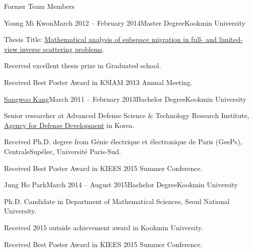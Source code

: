 \documentclass{resume} %
\begin{document}
\begin{rSection}{Former Team Members}
\begin{rSubsection}{Young Mi Kwon}{March 2012 -- February 2014}{Master Degree}{Kookmin University}
\item Thesis Title: \href{http://www.riss.kr/link?id=T13428254}{Mathematical analysis of subspace migration in full- and limited-view inverse scattering problems}.
\item Received excellent thesis prize in Graduated school.
\item Received Best Poster Award in KSIAM 2013 Annual Meeting.
\end{rSubsection}

\begin{rSubsection}{\href{https://sites.google.com/view/sangwookang/home}{Sangwoo Kang}}{March 2011 -- February 2013}{Bachelor Degree}{Kookmin University}
\item Senior researcher at Advanced Defense Science \& Technology Research Institute, \href{https://www.add.re.kr/eps}{Agency for Defense Development} in Korea.
\item Received Ph.D. degree from G\'enie \'electrique et \'electronique de Paris (GeePs), CentraleSup{\'e}lec, Universit\'e Paris-Sud.
\item Received Best Poster Award in KIEES 2015 Summer Conference.
\end{rSubsection}

\begin{rSubsection}{Jung Ho Park}{March 2014 -- August 2015}{Bachelor Degree}{Kookmin University}
\item Ph.D. Candidate in Department of Mathematical Sciences, Seoul National University.
\item Received 2015 outside achievement award in Kookmin University.
\item Received Best Poster Award in KIEES 2015 Summer Conference.
\end{rSubsection}


\end{rSection}
\end{document}
